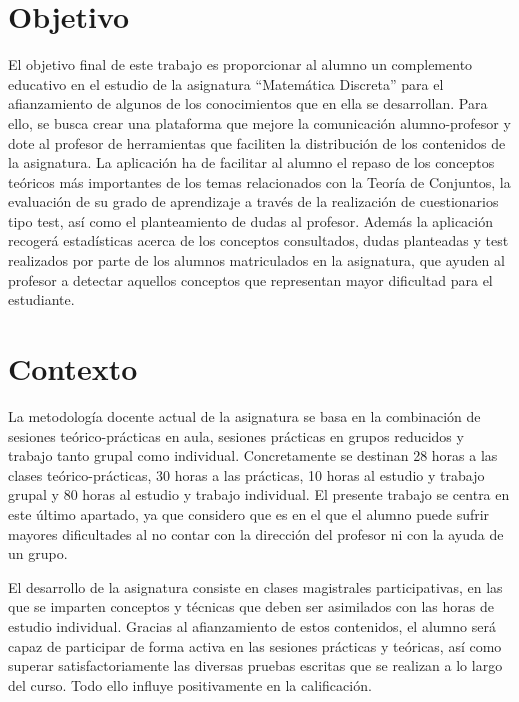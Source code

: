 \documentclass[openright,twoside,10pt]{book}
\begin{document}
    \section{Objetivo}\label{objetivo}
    
    El objetivo final de este trabajo es proporcionar al alumno un
    complemento educativo en el estudio de la asignatura \enquote{Matemática
    Discreta} para el afianzamiento de algunos de los conocimientos que en
    ella se desarrollan. Para ello, se busca crear una plataforma que mejore
    la comunicación alumno-profesor y dote al profesor de herramientas que
    faciliten la distribución de los contenidos de la asignatura. La
    aplicación ha de facilitar al alumno el repaso de los conceptos teóricos
    más importantes de los temas relacionados con la Teoría de Conjuntos, la
    evaluación de su grado de aprendizaje a través de la realización de
    cuestionarios tipo test, así como el planteamiento de dudas al profesor.
    Además la aplicación recogerá estadísticas acerca de los conceptos
    consultados, dudas planteadas y test realizados por parte de los alumnos
    matriculados en la asignatura, que ayuden al profesor a detectar
    aquellos conceptos que representan mayor dificultad para el estudiante.
    
    \section{Contexto}\label{contexto}
    
    La metodología docente actual de la asignatura
    \cite{guiamatematicadiscreta} se basa en la combinación de sesiones
    teórico-prácticas en aula, sesiones prácticas en grupos reducidos y
    trabajo tanto grupal como individual. Concretamente se destinan 28 horas
    a las clases teórico-prácticas, 30 horas a las prácticas, 10 horas al
    estudio y trabajo grupal y 80 horas al estudio y trabajo individual. El
    presente trabajo se centra en este último apartado, ya que considero que
    es en el que el alumno puede sufrir mayores dificultades al no contar
    con la dirección del profesor ni con la ayuda de un grupo.
    
    El desarrollo de la asignatura consiste en clases magistrales
    participativas, en las que se imparten conceptos y técnicas que deben
    ser asimilados con las horas de estudio individual. Gracias al
    afianzamiento de estos contenidos, el alumno será capaz de participar de
    forma activa en las sesiones prácticas y teóricas, así como superar
    satisfactoriamente las diversas pruebas escritas que se realizan a lo
    largo del curso. Todo ello influye positivamente en la calificación.
    
\end{document}
